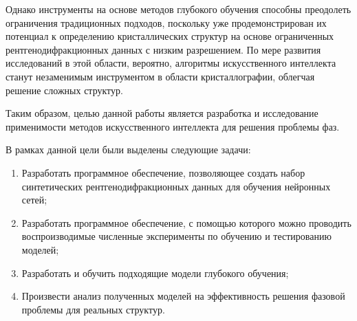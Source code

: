 Однако инструменты на основе методов глубокого обучения способны преодолеть ограничения традиционных подходов, поскольку уже продемонстрирован их потенциал к определению кристаллических структур на основе ограниченных рентгенодифракционных данных с низким разрешением. По мере развития исследований в этой области, вероятно, алгоритмы искусственного интеллекта станут незаменимым инструментом в области кристаллографии, облегчая решение сложных структур.

Таким образом, целью данной работы является разработка и исследование применимости методов искусственного интеллекта для решения проблемы фаз.

В рамках данной цели были выделены следующие задачи:

\begin{enumerate}
	\item Разработать программное обеспечение, позволяющее создать набор синтетических рентгенодифракционных данных для обучения нейронных сетей;
	\item Разработать программное обеспечение, с помощью которого можно проводить воспроизводимые численные эксперименты по обучению и тестированию моделей;
	\item Разработать и обучить подходящие модели глубокого обучения;
	\item Произвести анализ полученных моделей на эффективность решения фазовой проблемы для реальных структур.
\end{enumerate}